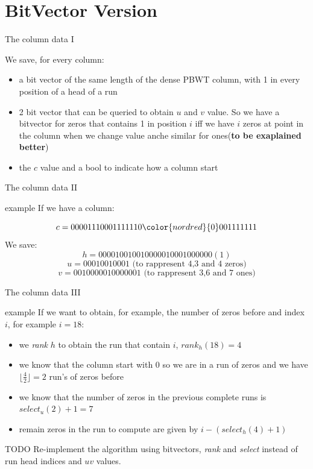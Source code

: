 \documentclass{beamer}
\begin{document}
\section{BitVector Version}
\begin{frame}{The column data I}
  \begin{block}{}
    We save, for every column:
    \begin{itemize}
      \item a bit vector of the same length of the dense PBWT column, with 1 in
      every position of a head of a run
      \item 2 bit vector that can be queried to obtain $u$ and $v$ value. So we
      have a bitvector for zeros that contains 1 in position $i$ iff we have $i$
      zeros at point in the column when we change value anche similar for
      ones(\textbf{to be exaplained better})
      \item the $c$ value and a bool to indicate how a column start
    \end{itemize}
  \end{block}
\end{frame}
\begin{frame}{The column data II}
  \begin{block}{example}
    If we have a column:
    
    \[c=00001110001111110{\color{nordred}{0}}001111111\]
    We save:
    \[h=000010010010000010001000000(1)\]
    \[u=00010010001\mbox{ (to rappresent 4,3 and 4 zeros)}\]
    \[v=0010000010000001\mbox{ (to rappresent 3,6 and 7 ones)}\]
  \end{block}
\end{frame}
\begin{frame}{The column data III}
  \begin{block}{example}
    If we want to obtain, for example, the number of zeros before and index $i$,
    for example $i=18$:
    \begin{itemize}
      \item we \textit{rank} $h$ to obtain the run that contain $i$,
      $rank_h(18)= 4$ 
      \item we know that the column start with 0 so we are in a run of zeros and
      we have $\lfloor\frac{4}{2}\rfloor = 2$ run's of zeros before
      \item we know that the number of zeros in the previous complete runs is
      $select_u(2)+1 = 7$
      \item remain zeros in the run to compute are given by $i-(select_h(4)+1)$
    \end{itemize}
  \end{block}
  \begin{alertblock}{TODO}
    Re-implement the algorithm using bitvectors, \textit{rank} and
    \textit{select} instead of run head indices and $uv$ values.
  \end{alertblock}
\end{frame}
%   
%   
\end{document}
